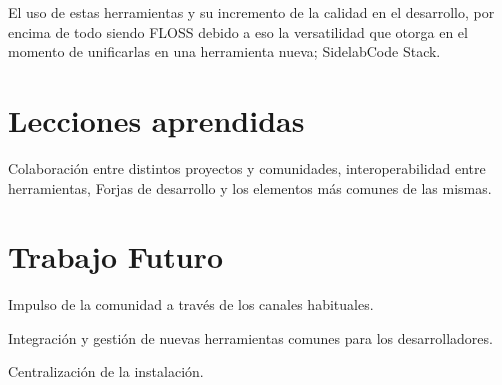 \documentclass[11pt]{scrartcl}
\begin{document}
\par El uso de estas herramientas y su incremento de la calidad en el desarrollo, por encima de todo siendo FLOSS debido a eso la versatilidad que otorga en el momento de unificarlas en una herramienta nueva; SidelabCode Stack.


\section{Lecciones aprendidas}
\label{sec:lecciones}

\par Colaboraci\'on entre distintos proyectos y comunidades, interoperabilidad entre herramientas, Forjas de desarrollo y los elementos m\'as comunes de las mismas.


\section{Trabajo Futuro}
\label{sec:trabajofuturo}

\par Impulso de la comunidad a través de los canales habituales.

\par Integraci\'on y gesti\'on de nuevas herramientas comunes para los desarrolladores.

\par Centralizaci\'on de la instalaci\'on.

\end{document}
